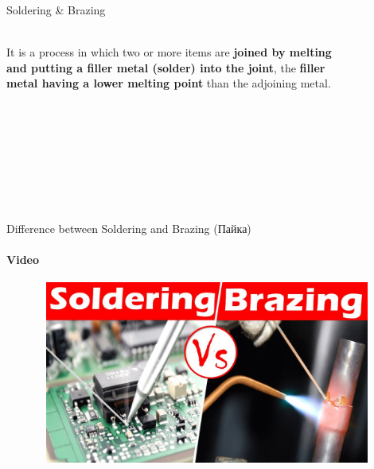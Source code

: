 \documentclass[aspectratio=169]{beamer}
\begin{document}
\begin{frame}[t]{Soldering \& Brazing}
    \framesubtitle{}
    \begin{columns}[T,onlytextwidth]
        \begin{column}{0.49\textwidth}
            It is a process in which two or more items are \textbf{joined by melting and putting a filler metal (solder) into the joint}, the \textbf{filler metal having a lower melting point} than the adjoining metal.
        \end{column}
        \begin{column}{0.49\textwidth}
            \begin{figure}[H]
                \centering\includegraphics[height=5cm,width=1\textwidth,keepaspectratio]{how_to_hold_solder.jpg}
                \label{fig:how_to_hold_solder.jpg}
            \end{figure}
        \end{column}
    \end{columns}
\end{frame}

\begin{frame}[t]{Difference between Soldering and Brazing (Пайка)}
    \framesubtitle{Video}
    \vspace{-0.6cm}
    \begin{figure}[H]
        \href{https://youtu.be/Rq_Vuye4HL0}{
            \centering\includegraphics[height=6cm,width=1\textwidth,keepaspectratio]{dif_sold_braz_video.jpg}}
        \label{fig:dif_sold_braz_video.jpg}
    \end{figure}
\end{frame}
\end{document}
